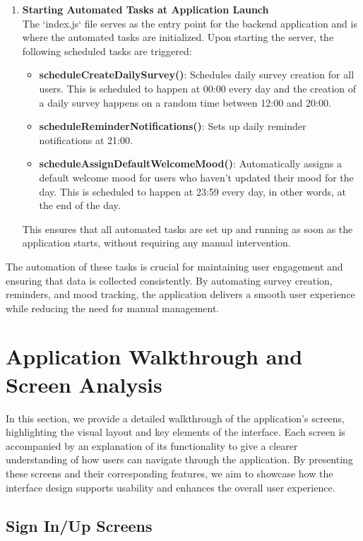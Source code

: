 \begin{enumerate}
    \item \textbf{Starting Automated Tasks at Application Launch} \\
    The `index.js` file serves as the entry point for the backend application and is where the automated tasks are initialized. Upon starting the server, the following scheduled tasks are triggered:
    \begin{itemize}
        \item \textbf{scheduleCreateDailySurvey()}: Schedules daily survey creation for all users. This is scheduled to happen at 00:00 every day and the creation of a daily survey happens on a random time between 12:00 and 20:00.
        \item \textbf{scheduleReminderNotifications()}: Sets up daily reminder notifications at 21:00.
        \item \textbf{scheduleAssignDefaultWelcomeMood()}: Automatically assigns a default welcome mood for users who haven’t updated their mood for the day. This is scheduled to happen at 23:59 every day, in other words, at the end of the day.
    \end{itemize}
    This ensures that all automated tasks are set up and running as soon as the application starts, without requiring any manual intervention.
\end{enumerate}

\noindent The automation of these tasks is crucial for maintaining user engagement and ensuring that data is collected consistently. By automating survey creation, reminders, and mood tracking, the application delivers a smooth user experience while reducing the need for manual management.

\section{Application Walkthrough and Screen Analysis}

In this section, we provide a detailed walkthrough of the application's screens, highlighting the visual layout and key elements of the interface. Each screen is accompanied by an explanation of its functionality to give a clearer understanding of how users can navigate through the application. By presenting these screens and their corresponding features, we aim to showcase how the interface design supports usability and enhances the overall user experience.

\subsection{Sign In/Up Screens}

